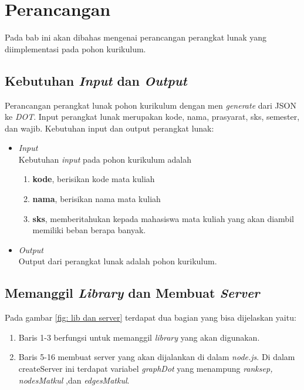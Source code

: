 \chapter{Perancangan}
\label{chap: Perancangan}

Pada bab ini akan dibahas mengenai perancangan perangkat lunak yang diimplementasi pada pohon kurikulum.

\section{Kebutuhan \textit{Input} dan \textit{Output}}
\label{sec: Kebutuhan Input dan Output}
Perancangan perangkat lunak pohon kurikulum dengan men \textit{generate} dari JSON ke \textit{DOT}. Input perangkat lunak merupakan kode, nama, prasyarat, sks, semester, dan wajib.
Kebutuhan input dan output perangkat lunak:
\begin{itemize}
\item \textit{Input} \\
Kebutuhan \textit{input} pada pohon kurikulum adalah
\begin{enumerate}
\item \textbf{kode}, berisikan kode mata kuliah
\item \textbf{nama}, berisikan nama mata kuliah
\item \textbf{sks}, memberitahukan kepada mahasiswa mata kuliah yang akan diambil memiliki beban berapa banyak.
\end{enumerate}
\item \textit{Output}\\
Output dari perangkat lunak adalah pohon kurikulum.
\end{itemize}

\section{Memanggil \textit{Library} dan Membuat \textit{Server}}
\label{sec: Memanggil Library dan Membuat Server}

Pada gambar \ref{fig: lib dan server} terdapat dua bagian yang bisa dijelaskan yaitu:
\begin{enumerate}
\item Baris 1-3 berfungsi untuk memanggil \textit{library} yang akan digunakan.
\item Baris 5-16 membuat server yang akan dijalankan di dalam \textit{node.js}. Di dalam createServer ini terdapat variabel \textit{graphDot} yang menampung \textit{ranksep, nodesMatkul} ,dan \textit{edgesMatkul}.
\end{enumerate}

